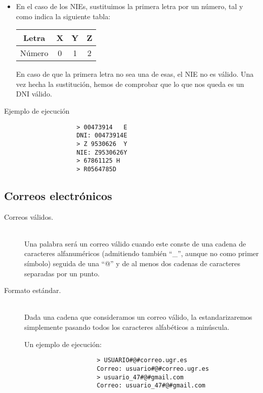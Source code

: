\documentclass[12pt]{article}
\begin{document}
\begin{description}
\begin{itemize}
\begin{table}[H]
\begin{tabular}{|c|c|c|c|c|c|c|c|c|c|c|c|c|}
                        \hline
                    \end{tabular}
                    \end{table}
                \item En el caso de los NIEs, sustituimos la primera letra por un número, tal y como indica la siguiente tabla:
                    \begin{table}[H]
                    \centering
                    \begin{tabular}{|c|c|c|c|}
                        \hline
                        Letra & X & Y & Z \\
                        \hline
                        Número & 0 & 1 & 2 \\
                        \hline
                    \end{tabular}
                    \end{table}
                    En caso de que la primera letra no sea una de esas, el NIE no es válido. Una vez hecha la sustitución, hemos de comprobar que lo que nos queda es un DNI válido.
            \end{itemize}
            \begin{ejemplo}
                Ejemplo de ejecución
                \begin{verbatim}
                    > 00473914   E
                    DNI: 00473914E
                    > Z 9530626  Y
                    NIE: Z9530626Y
                    > 67861125 H
                    > R0564785D
                \end{verbatim}
            \end{ejemplo}
    \end{description}
    \subsection{Correos electrónicos}
    \begin{description}
        \item [Correos válidos.]~\\
            Una palabra será un correo válido cuando este conste de una cadena de caracteres alfanuméricos (admitiendo también ``\_'', aunque no como primer símbolo) seguida de una ``@'' y de al menos dos cadenas de caracteres separadas por un punto.
        \item [Formato estándar.]~\\
            Dada una cadena que consideramos un correo válido, la estandarizaremos simplemente pasando todos los caracteres alfabéticos a minúscula.
            \begin{ejemplo}
                Un ejemplo de ejecución:
                \begin{verbatim}
                    > USUARIO#@#correo.ugr.es
                    Correo: usuario#@#correo.ugr.es
                    > usuario_47#@#gmail.com
                    Correo: usuario_47#@#gmail.com
                \end{verbatim}
            \end{ejemplo}
    \end{description}
\end{document}
